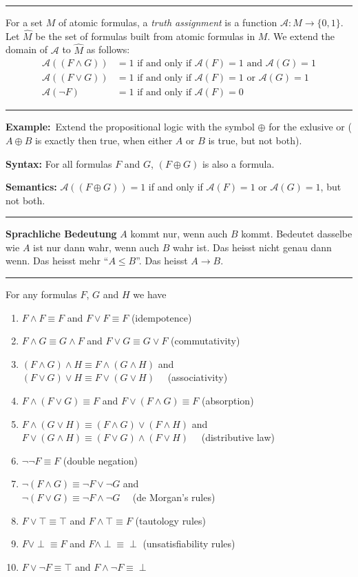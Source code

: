 \documentclass[a4paper]{extarticle}
\newcommand{\Ex}{\textbf{Example:}\ }
\newcommand{\cA}{\mathcal{A}}
\newcommand{\sep}{\vspace{5pt}\noindent\hrule\vspace{5pt}}
\begin{document}
\begin{multicols*}{2}
\sep

\Def[Semantics] For a set $M$ of atomic formulas, a \emph{truth assignment} is a
function $\cA\colon M \to \{0,1\}$. Let $\widehat{M}$ be the set of formulas
built from atomic formulas in $M$. We extend the domain of $\cA$ to
$\widehat{M}$ as follows:
\begin{align*}
\cA((F\land G)) &= 1 \text{ if and only if } \cA(F)=1 \text{ and } \cA(G)=1\\
\cA((F\lor G))  &= 1 \text{ if and only if } \cA(F)=1 \text{ or } \cA(G)=1\\
\cA(\lnot F)  &= 1 \text{ if and only if } \cA(F)=0 
\end{align*}

\sep

\Ex	Extend the propositional logic with the symbol $\oplus$ for the
exlusive or ($A\oplus B$ is exactly then true, when either $A$ or $B$ is true,
but not both). 

\textbf{Syntax:} For all formulas $F$ and $G$, $(F\oplus G)$ is also a formula.

\textbf{Semantics:} $\cA((F\oplus G))=1$ if and only if $\cA(F)=1$ or
$\cA(G)=1$, but not both.

\sep

\textbf{Sprachliche Bedeutung} $A$ kommt nur, wenn auch $B$ kommt. Bedeutet
dasselbe wie $A$ ist nur dann wahr, wenn auch $B$ wahr ist. Das heisst nicht
genau dann wenn. Das heisst mehr ``$A\leq B$''. Das heisst $A\rightarrow B$. 

\sep

\Lem For any formulas $F$, $G$ and $H$ we have
\begin{enumerate}[label=\arabic*)]
  \item $F\land F\equiv  F$ and $F\lor F \equiv F$ (idempotence)
  \item $F\land G\equiv G\land F$ and $F\lor G \equiv G\lor F$ (commutativity)
  \item $(F\land G)\land H \equiv F \land (G\land H)$ and \\$(F\lor G)\lor H
  \equiv F\lor (G\lor H)$ \ \ (associativity)
  \item $F\land(F\lor G)\equiv F$ and $F\lor(F\land G)\equiv F$ (absorption)
  \item $F\land(G\lor H)\equiv (F\land G) \lor (F\land H)$ and\\
  		$F\lor(G\land H)\equiv (F\lor G) \land (F\lor H)$ \ \ (distributive law)
  \item $\lnot \lnot F \equiv F$ (double negation)
  \item $\lnot(F\land G)\equiv \lnot F\lor \lnot G$ and\\
  $\lnot(F\lor G)\equiv \lnot F \land \lnot G$ \ \ (de Morgan's rules)
  \item $F\lor \top\equiv \top$ and $F\land \top \equiv F$ (tautology rules)
  \item $F\lor\perp\equiv F$ and $F\land\perp\equiv \perp$ (unsatisfiability
  rules)
  \item $F\lor\lnot F\equiv \top$ and $F\land \lnot F\equiv \perp$
\end{enumerate}


\end{multicols*}
\end{document}
